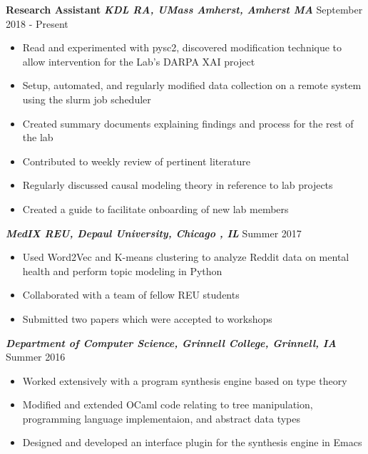 \documentclass[9pt]{extarticle}
\begin{document}
\textbf{Research Assistant}
\textbf{\textit{KDL RA, UMass Amherst, Amherst MA}}
\hfill September 2018 - Present
\begin{itemize}
\item Read and experimented with pysc2, discovered
  modification technique to allow intervention for the Lab's DARPA XAI project
\item Setup, automated, and regularly modified data collection on a
  remote system using the slurm job scheduler
\item Created summary documents explaining findings and process
  for the rest of the lab
\item Contributed to weekly review of pertinent literature
\item Regularly discussed causal modeling theory in reference to lab projects
\item Created a guide to facilitate onboarding of new lab members
\end{itemize}

\textbf{\textit{MedIX REU, Depaul University, Chicago , IL}}
\hfill Summer 2017
\begin{itemize}
\item Used Word2Vec and K-means clustering to analyze Reddit data on
  mental health and perform topic modeling in Python
\item Collaborated with a team of fellow REU students
\item Submitted two papers which were accepted to workshops
\end{itemize}
\vspace{0.2cm}


\textbf{\textit{Department of Computer Science, Grinnell College,
    Grinnell, IA}}
\hfill Summer 2016
\begin{itemize}
\item Worked extensively with a program synthesis engine based on type theory
\item Modified and extended OCaml code relating to tree manipulation,
  programming language implementaion, and abstract data types
\item Designed and developed an interface plugin for the 
  synthesis engine in Emacs
\end{itemize}
\vspace{0.4cm}
\end{document}
